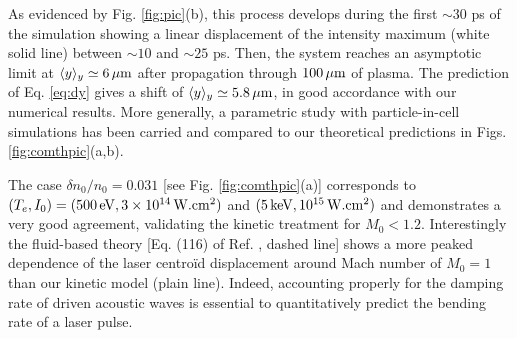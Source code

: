 \documentclass[%
 reprint,
 amsmath,amssymb,
 aps,
]{revtex4-1}
\begin{document}
As evidenced by Fig. \ref{fig:pic}(b), this process develops during the first $\sim 30$ ps  of the simulation showing a linear displacement of the intensity maximum (white solid line) between  $\sim 10$ and $\sim 25$ ps. Then, the system reaches an asymptotic limit at $\langle y \rangle_y\simeq 6\, \rm \mu m$ after propagation through $100 \, \rm \mu m$ of plasma. The prediction of Eq. \eqref{eq:dy} gives a shift of $\langle y \rangle_y\simeq  5.8 \, \rm \mu m$, in good accordance with our numerical results. More generally, a parametric study with particle-in-cell simulations has been carried and compared to our theoretical predictions in Figs. \ref{fig:comthpic}(a,b).

The case $\delta n_0/n_0=0.031$  [see Fig. \ref{fig:comthpic}(a)] corresponds to $(T_e, I_0)=(500\, \rm{eV}, 3\times 10^{14}\, \rm{W.cm^2})$ and $(5\, \rm{keV}, 10^{15}\, \rm{W.cm^2})$ and demonstrates a very good agreement, validating the kinetic treatment for $M_0 < 1.2$. Interestingly the fluid-based theory [Eq. (116) of Ref. \cite{POP_Rose_97}, dashed line] shows a more peaked dependence of the laser centro\"id displacement around Mach number of $M_0=1$ than our kinetic model (plain line). 
Indeed, accounting properly for the damping rate of driven acoustic waves is essential to quantitatively predict the bending rate of a laser pulse. 
\end{document}
